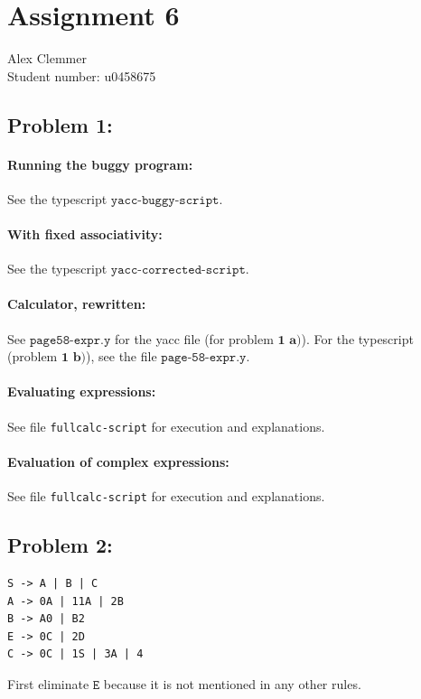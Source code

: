 \documentclass[a4paper]{article}
\begin{document}
\section*{Assignment 6 }
Alex Clemmer\\
Student number: u0458675

\subsection*{Problem 1:} 

\paragraph{Running the buggy program:} See the typescript $\texttt{yacc-buggy-script}$.

\paragraph{With fixed associativity:} See the typescript $\texttt{yacc-corrected-script}$.

\paragraph{Calculator, rewritten:} See $\texttt{page58-expr.y}$ for the yacc file (for problem $\textbf{1 a)}$). For the typescript (problem $\textbf{1 b)}$), see the file $\texttt{page-58-expr.y}$.

\paragraph{Evaluating expressions:} See file \texttt{fullcalc-script} for execution and explanations.

\paragraph{Evaluation of complex expressions:} See file \texttt{fullcalc-script} for execution and explanations.

\subsection*{Problem 2:} 

\begin{verbatim}
S -> A | B | C
A -> 0A | 11A | 2B
B -> A0 | B2
E -> 0C | 2D
C -> 0C | 1S | 3A | 4
\end{verbatim}

First eliminate  $\texttt{E}$ because it is not mentioned in any other rules.
\end{document}
